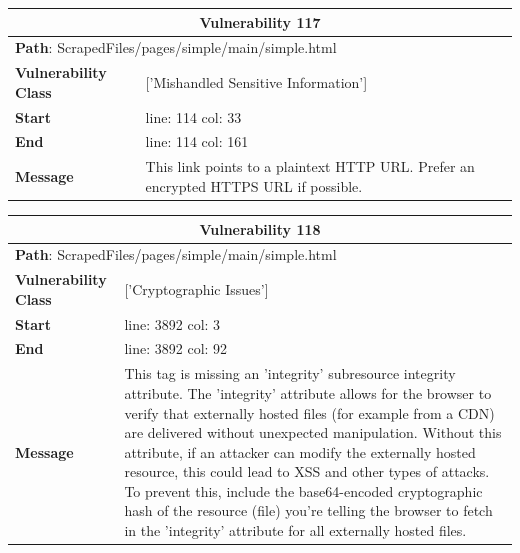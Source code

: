 \documentclass[12pt]{article}
\begin{document}
\vspace{0.7cm}
\FloatBarrier
\begin{table}[!h]
\centering
\renewcommand{\arraystretch}{1.3}
\begin{tabular}{|l|p{10cm}|}
\hline
\multicolumn{2}{|c|}{\textbf{Vulnerability 117}} \\
\hline
\multicolumn{2}{|l|}{\textbf{Path}: ScrapedFiles/pages/simple/main/simple.html} \\
\hline
\textbf{Vulnerability Class} & ['Mishandled Sensitive Information'] \\
\hline
\textbf{Start} & line: 114 \quad col: 33 \\
\hline
\textbf{End} & line: 114 \quad col: 161 \\
\hline
\textbf{Message} & This link points to a plaintext HTTP URL. Prefer an encrypted HTTPS URL if possible. \\
\hline
\end{tabular}
\end{table}
\vspace{0.7cm}
\FloatBarrier
\begin{table}[!h]
\centering
\renewcommand{\arraystretch}{1.3}
\begin{tabular}{|l|p{10cm}|}
\hline
\multicolumn{2}{|c|}{\textbf{Vulnerability 118}} \\
\hline
\multicolumn{2}{|l|}{\textbf{Path}: ScrapedFiles/pages/simple/main/simple.html} \\
\hline
\textbf{Vulnerability Class} & ['Cryptographic Issues'] \\
\hline
\textbf{Start} & line: 3892 \quad col: 3 \\
\hline
\textbf{End} & line: 3892 \quad col: 92 \\
\hline
\textbf{Message} & This tag is missing an 'integrity' subresource integrity attribute. The 'integrity' attribute allows for the browser to verify that externally hosted files (for example from a CDN) are delivered without unexpected manipulation. Without this attribute, if an attacker can modify the externally hosted resource, this could lead to XSS and other types of attacks. To prevent this, include the base64-encoded cryptographic hash of the resource (file) you're telling the browser to fetch in the 'integrity' attribute for all externally hosted files. \\
\hline
\end{tabular}
\end{table}
\vspace{0.7cm}
\FloatBarrier
\end{document}
